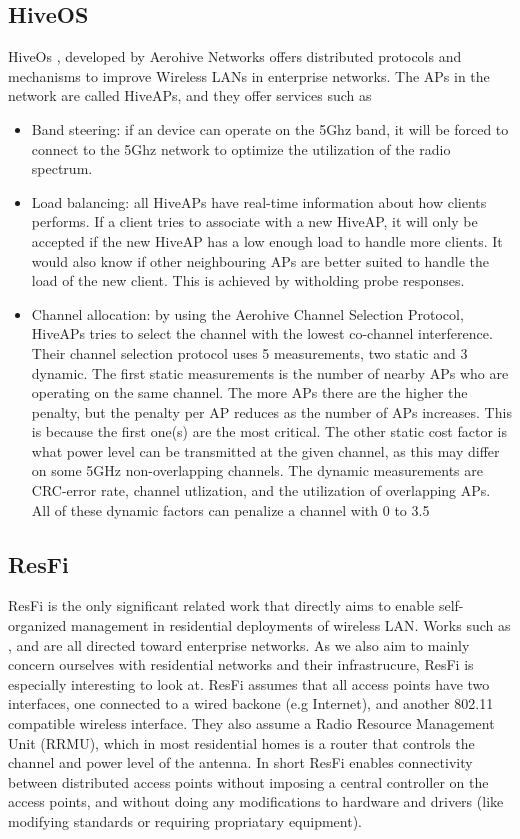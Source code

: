 \subsection{HiveOS}
HiveOs \cite{Aerohive}, developed by Aerohive Networks offers distributed protocols and mechanisms to improve Wireless LANs in enterprise networks. The APs 
in the network are called HiveAPs, and they offer services such as
\begin{itemize}
	\item Band steering: if an device can operate on the 5Ghz band, it will be forced to connect to the 5Ghz network to optimize the utilization of the radio spectrum. 
	\item Load balancing: all HiveAPs have real-time information about how clients performs. If a client tries to associate with a new HiveAP, it will only be accepted
				if the new HiveAP has a low enough load to handle more clients. It would also know if other neighbouring APs are better suited to handle the load of the new client.
				This is achieved by witholding probe responses. 
	\item Channel allocation: by using the Aerohive Channel Selection Protocol, HiveAPs tries to select the channel with the lowest co-channel interference. Their channel selection protocol uses 5 measurements, two static and 3 dynamic.
	The first static measurements is the number of nearby APs who are operating on the same channel. The more APs there are the higher the penalty, but the penalty per AP reduces as the number of APs increases. This
		is because the first one(s) are the most critical. The other static cost factor is what power level can be transmitted at the given channel, as this may differ on some 5GHz non-overlapping channels. The dynamic measurements are CRC-error rate, channel utlization,
	and the utilization of overlapping APs. All of these dynamic factors can penalize a channel with 0 to 3.5%
\end{itemize}

\subsection{ResFi}
ResFi \cite{resfi} is the only significant related work that directly aims to enable self-organized management in residential deployments of wireless LAN. Works such as \cite{Murty2}, \cite{ciscoRRM} and \cite{Aerohive} are all directed toward enterprise
networks. As we also aim to mainly concern ourselves with residential networks and their infrastrucure, ResFi is especially interesting to look at. ResFi assumes that all access points have two interfaces, one connected to a wired backone (e.g Internet), and another
802.11 compatible wireless interface. They also assume a Radio Resource Management Unit (RRMU), which in most residential homes is a router that controls the channel and power level of the antenna.  In short ResFi enables connectivity between distributed access points without imposing a central controller on the access points, and without doing any modifications to hardware and drivers (like modifying standards or requiring propriatary equipment). 

